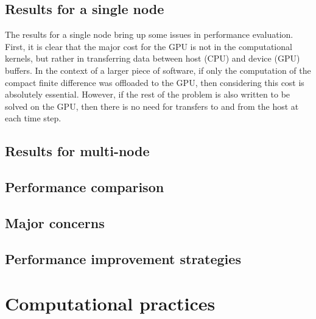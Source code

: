 \documentclass{article}
\begin{document}
    \subsection{Results for a single node}
    The results for a single node bring up some issues in performance evaluation.
    First, it is clear that the major cost for the GPU is not in the computational
    kernels, but rather in transferring data between host (CPU) and device (GPU) buffers.
    In the context of a larger piece of software,
    if only the computation of the compact finite difference was offloaded
    to the GPU, then considering this cost is absolutely essential.
    However, if the rest of the problem is also written to be solved on the GPU,
    then there is no need for transfers to and from the host at each
    time step.

    \subsection{Results for multi-node}

    \subsection{Performance comparison}

    \subsection{Major concerns}

    \subsection{Performance improvement strategies}

\section{Computational practices}
\end{document}
